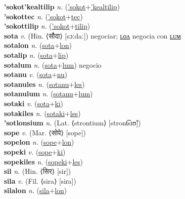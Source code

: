 \textbf{'sokot'kealtilip} \textit{n.} (\hyperref['sokot]{'sokot}+\hyperref['kealtilip]{'kealtilip})
 \label{'sokot'kealtilip} \\
\textbf{'sokottec} \textit{n.} (\hyperref['sokot]{'sokot}+\hyperref[tec]{tec})
 \label{'sokottec} \\
\textbf{'sokottilip} \textit{n.} (\hyperref['sokot]{'sokot}+\hyperref[tilip]{tilip})
 \label{'sokottilip} \\
\textbf{sota} \textit{v.} (Hin. ⟨सौदा⟩ [sɔːdaː])
negociar; \hyperref[sotalon]{ʟᴏᴧ} negocia con \hyperref[sotalum]{ʟᴜᴍ} \label{sota} \\
\textbf{sotalon} \textit{n.} (\hyperref[sota]{sota}+\hyperref[lon]{lon})
 \label{sotalon} \\
\textbf{sotalip} \textit{n.} (\hyperref[sota]{sota}+\hyperref[lip]{lip})
 \label{sotalip} \\
\textbf{sotalum} \textit{n.} (\hyperref[sota]{sota}+\hyperref[lum]{lum})
negocio \label{sotalum} \\
\textbf{sotanu} \textit{v.} (\hyperref[sota]{sota}+\hyperref[nu]{nu})
 \label{sotanu} \\
\textbf{sotanules} \textit{n.} (\hyperref[sotanu]{sotanu}+\hyperref[les]{les})
 \label{sotanules} \\
\textbf{sotanulum} \textit{n.} (\hyperref[sotanu]{sotanu}+\hyperref[lum]{lum})
 \label{sotanulum} \\
\textbf{sotaki} \textit{v.} (\hyperref[sota]{sota}+\hyperref[ki]{ki})
 \label{sotaki} \\
\textbf{sotakiles} \textit{n.} (\hyperref[sotaki]{sotaki}+\hyperref[les]{les})
 \label{sotakiles} \\
\textbf{'sotlonsium} \textit{n.} (Lat. ⟨strontium⟩ [stront͡sɪʊ̃])
 \label{'sotlonsium} \\
\textbf{sope} \textit{v.} (Mar. ⟨सोपे⟩ [sope])
 \label{sope} \\
\textbf{sopelon} \textit{n.} (\hyperref[sope]{sope}+\hyperref[lon]{lon})
 \label{sopelon} \\
\textbf{sopeki} \textit{v.} (\hyperref[sope]{sope}+\hyperref[ki]{ki})
 \label{sopeki} \\
\textbf{sopekiles} \textit{n.} (\hyperref[sopeki]{sopeki}+\hyperref[les]{les})
 \label{sopekiles} \\
\textbf{sil} \textit{n.} (Hin. ⟨सिर⟩ [sir])
 \label{sil} \\
\textbf{sila} \textit{v.} (Fil. ⟨sira⟩ [siɾa])
 \label{sila} \\
\textbf{silalon} \textit{n.} (\hyperref[sila]{sila}+\hyperref[lon]{lon})

